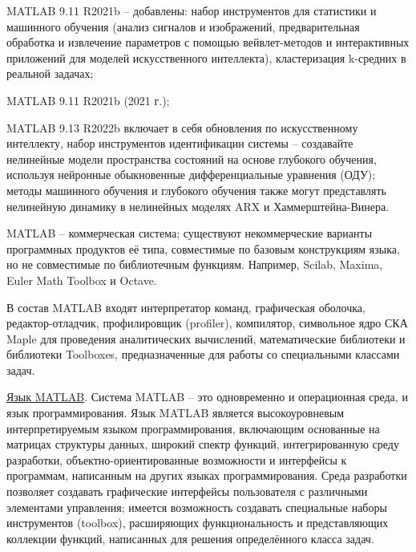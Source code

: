 \begin{textitemize}
	\item MATLAB 9.11 R2021b -- добавлены: набор инструментов для статистики и машинного обучения (анализ сигналов и изображений, предварительная обработка и извлечение параметров с помощью вейвлет-методов и интерактивных приложений для моделей искусственного интеллекта), кластеризация k-средних в реальной задачах; 
	\item MATLAB 9.11 R2021b (2021 г.);
	\item MATLAB 9.13 R2022b включает в себя обновления по искусственному интеллекту, набор инструментов идентификации системы -- создавайте нелинейные модели пространства состояний на основе глубокого обучения, используя нейронные обыкновенные дифференциальные уравнения (ОДУ); методы машинного обучения и глубокого обучения также могут представлять нелинейную динамику в нелинейных моделях ARX и Хаммерштейна-Винера.
\end{textitemize}

MATLAB -- коммерческая система; существуют некоммерческие варианты программных продуктов её типа, совместимые по базовым конструкциям языка, но не совместимые по библиотечным функциям. Например, Scilab, Maxima, Euler Math Toolbox и Octave.

В состав MATLAB входят интерпретатор команд, графическая оболочка, редактор-отладчик, профилировщик (profiler), компилятор, символьное ядро СКА Maple для проведения аналитических вычислений, математические библиотеки и библиотеки Toolboxes, предназначенные для работы со специальными классами задач.

\underline{Язык MATLAB}.
Система MATLAB -- это одновременно и операционная среда, и язык программирования. Язык MATLAB является высокоуровневым интерпретируемым языком программирования, включающим основанные на матрицах структуры данных, широкий спектр функций, интегрированную среду разработки, объектно-ориентированные возможности и интерфейсы к программам, написанным на других языках программирования. Среда разработки позволяет создавать графические интерфейсы пользователя с различными элементами управления; имеется возможность создавать специальные наборы инструментов (toolbox), расширяющих функциональность и представляющих коллекции функций, написанных для решения определённого класса задач.

